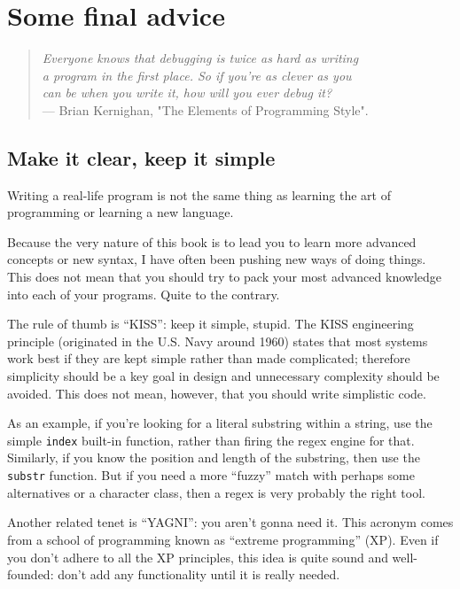 \chapter{Some final advice}

\begin{quote}
\raggedleft 
\emph{Everyone knows that debugging is twice as hard as writing \\ 
a program in the first place. So if you're as clever as you \\
can be when you write it, how will you ever debug it? }\\
--- Brian Kernighan, "The Elements of Programming Style".
\end{quote}

\section{Make it clear, keep it simple}

Writing a real-life program is not the same thing as learning 
the art of programming or learning a new language.

Because the very nature of this book is to lead you to learn 
more advanced concepts or new syntax, I have often been 
pushing new ways of doing things. This does not mean that 
you should try to pack your most advanced knowledge into 
each of your programs. Quite to the contrary.

The rule of thumb is ``KISS'': keep it simple, stupid. The 
KISS engineering principle (originated in the U.S. Navy 
around 1960) states that most systems work best if they 
are kept simple rather than made complicated; therefore 
simplicity should be a key goal in design and unnecessary 
complexity should be avoided. This does not mean, however, 
that you should write simplistic code.

As an example, if you're looking for a literal substring 
within a string, use the simple {\tt index} built-in function, 
rather than firing the regex engine for that. Similarly, 
if you know the position and length of the substring, then 
use the {\tt substr} function. But if you need a more ``fuzzy'' 
match with perhaps some alternatives or a character class, then 
a regex is very probably the right tool.

Another related tenet is ``YAGNI'': you  aren't gonna need 
it. This acronym comes from a school of programming 
known as ``extreme programming'' (XP). Even if you don't 
adhere to all the XP principles, this idea is quite sound 
and well-founded: don't add any functionality until it is 
really needed.

